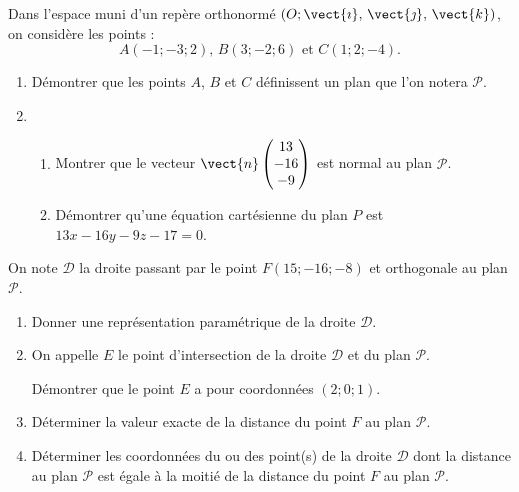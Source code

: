 Dans l'espace muni d'un repère orthonormé $\left(O;\vect{\imath},\,\vect{\jmath},\,\vect{k}\right)$, on considère les
points : \[ A(-1;-3;2) \text{, } B(3;-2;6) \text{ et } C(1;2;-4). \]

\begin{enumerate}
	\item Démontrer que les points $A$, $B$ et $C$ définissent un plan que l'on notera $\mathcal{P}$.
	\item 
	\begin{enumerate}
		\item Montrer que le vecteur $\vect{n}\begin{pmatrix}13\\-16\\-9\end{pmatrix}$  est normal au plan $\mathcal{P}$.
		\item Démontrer qu'une équation cartésienne du plan $P$ est $13x - 16y - 9z- 17 = 0$.
	\end{enumerate}
\end{enumerate}

On note $\mathcal{D}$ la droite passant par le point $F(15;-16;-8)$ et orthogonale au plan $\mathcal{P}$.

\begin{enumerate}[resume]
	\item Donner une représentation paramétrique de la droite $\mathcal{D}$.
	\item On appelle $E$ le point d'intersection de la droite $\mathcal{D}$ et du plan $\mathcal{P}$.
	
	Démontrer que le point $E$ a pour coordonnées $(2;0;1)$.
	\item Déterminer la valeur exacte de la distance du point $F$ au plan $\mathcal{P}$.
	\item Déterminer les coordonnées du ou des point(s) de la droite $\mathcal{D}$ dont la distance au plan $\mathcal{P}$ est égale à la moitié de la distance du point $F$ au plan $\mathcal{P}$.
\end{enumerate}